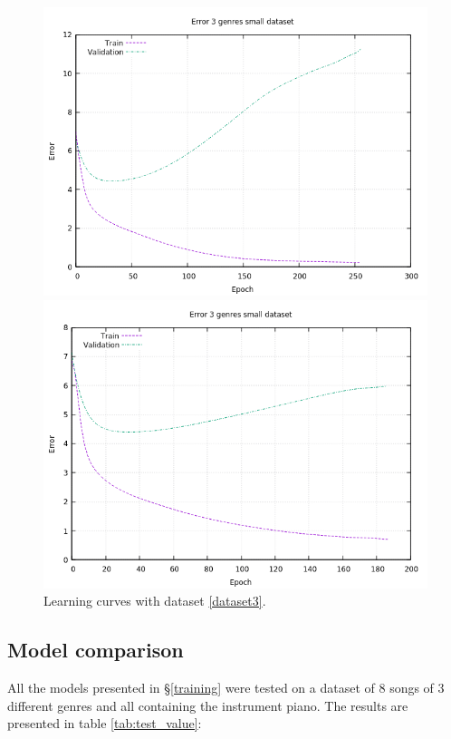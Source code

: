 \begin{figure}[H]
	\centering
	\begin{minipage}[t]{0.5\linewidth}
		\includegraphics[width=\linewidth]{img/Plot/small/plot_small_64_0_drop.png}
	\end{minipage}%
	\begin{minipage}[t]{0.5\linewidth}
		\includegraphics[width=\linewidth]{img/Plot/small/plot_small_64_0.1_drop.png}
	\end{minipage}
	\caption{Learning curves with dataset \ref{dataset3}.}
	\label{fig:d3}
\end{figure}

\subsection{Model comparison}
All the models presented in \S \ref{training} were tested on a dataset of 8 songs of 3 different genres and all containing the instrument piano.
The results are presented in table \ref{tab:test_value}:


